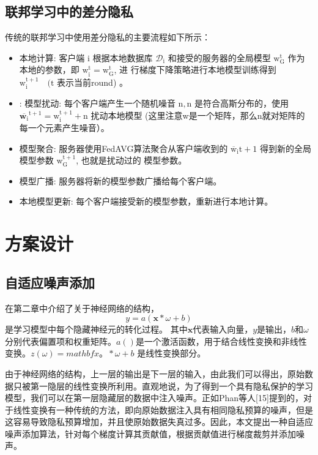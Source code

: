 \subsection{联邦学习中的差分隐私}
传统的联邦学习中使用差分隐私的主要流程如下所示：
\begin{itemize}
\item 本地计算:
客户端 $\mathrm{i}$ 根据本地数据库 $\mathcal{D}_{\mathrm{i}}$ 和接受的服务器的全局模型 $\mathrm{w}_{\mathrm{G}}^{\mathrm{t}}$ 作为本地的参数，即 $\mathrm{w}_{\mathrm{i}}^{\mathrm{t}}=\mathrm{w}_{\mathrm{G}}^{\mathrm{t}}$, 进 行梯度下降策略进行本地模型训练得到 $\mathrm{w}_{\mathrm{i}}^{\mathrm{t}+1} \quad(\mathrm{t}$ 表示当前round) 。

\item: 模型扰动:
每个客户端产生一个随机噪音 $\mathrm{n}, \mathrm{n}$ 是符合高斯分布的，使用 $\overline{\mathbf{w}_{\mathrm{i}}}^{\mathrm{t}+1}=\mathrm{w}_{\mathrm{i}}^{\mathrm{t}+1}+\mathrm{n}$ 扰动本地模型 (这里注意w是一个矩阵，那么n就对矩阵的每一个元素产生噪音）。

\item 模型聚合:
服务器使用FedAVG算法聚合从客户端收到的 $\overline{\mathrm{w}}_{\mathrm{i}} \mathrm{t}+1$ 得到新的全局模型参数 $\mathrm{w}_{\mathrm{G}}^{\mathrm{t}+1}$, 也就是扰动过的 模型参数。

\item 模型广播:
服务器将新的模型参数广播给每个客户端。

\item 本地模型更新:
每个客户端接受新的模型参数，重新进行本地计算。
\end{itemize}

\section{方案设计}
\subsection{自适应噪声添加}
在第二章中介绍了关于神经网络的结构，
$$
y=a(\mathbf{x} * \omega+b)
$$是学习模型中每个隐藏神经元的转化过程。
其中$\mathbf{x}$代表输入向量，$y$是输出，$b$和$\omega$分别代表偏置项和权重矩阵。$a()$是一个激活函数，用于结合线性变换和非线性变换。$z(\omega)=mathbf{x}。* \omega+b$ 是线性变换部分。

由于神经网络的结构，上一层的输出是下一层的输入，由此我们可以得出，原始数据只被第一隐层的线性变换所利用。直观地说，为了得到一个具有隐私保护的学习模型，我们可以在第一层隐藏层的数据中注入噪声。正如Phan等人[15]提到的，对于线性变换有一种传统的方法，即向原始数据注入具有相同隐私预算的噪声，但是这容易导致隐私预算增加，并且使原始数据失真过多。因此，本文提出一种自适应噪声添加算法，针对每个梯度计算其贡献值，根据贡献值进行梯度裁剪并添加噪声。

